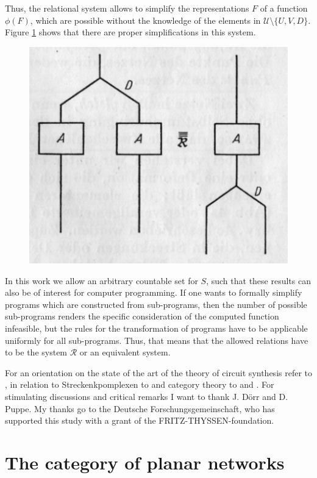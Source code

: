 \documentclass{article}
\begin{document}
Thus, the relational system allows to simplify the representations $F$ of a function $\phi(F)$, which are possible without the knowledge of the elements in $\mathcal{U} \setminus \{ U, V, D \}$. Figure \ref{fig:figure2} shows that there are proper simplifications in this system.

\begin{figure}
\includegraphics[]{figure2.png}
\caption{}
\label{fig:figure2}
\end{figure}

In this work we allow an arbitrary countable set for $S$, such that these results can also be of interest for computer programming. If one wants to formally simplify programs which are constructed from sub-programs, then the number of possible sub-programs renders the specific consideration of the computed function infeasible, but the rules for the transformation of programs have to be applicable uniformly for all sub-programs. Thus, that means that the allowed relations have to be the system
$\mathcal{R}$ or an equivalent system.

For an orientation on the state of the art of the theory of circuit synthesis refer to \cite{circuit-synthesis}, in relation to Streckenkpomplexen to \cite{combinatory-topology} and category theory to \cite{categories-functors} and \cite{category-theory}.
For stimulating discussions and critical remarks I want to thank J. D\"{o}rr and D. Puppe. My thanks go to the Deutsche Forschungsgemeinschaft, who has supported this study with a grant of the FRITZ-THYSSEN-foundation.

\section{The category of planar networks }
\end{document}
